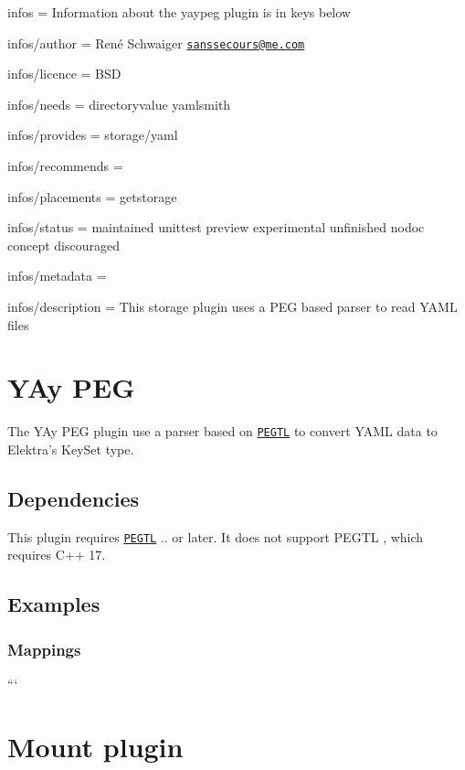 
\begin{DoxyItemize}
\item infos = Information about the yaypeg plugin is in keys below
\item infos/author = René Schwaiger \href{mailto:sanssecours@me.com}{\tt sanssecours@me.\+com}
\item infos/licence = B\+SD
\item infos/needs = directoryvalue yamlsmith
\item infos/provides = storage/yaml
\item infos/recommends =
\item infos/placements = getstorage
\item infos/status = maintained unittest preview experimental unfinished nodoc concept discouraged
\item infos/metadata =
\item infos/description = This storage plugin uses a P\+EG based parser to read Y\+A\+ML files
\end{DoxyItemize}\hypertarget{md_src_plugins_yaypeg_README_src_plugins_yaypeg_README_md}{}\section{Y\+Ay P\+EG}\label{md_src_plugins_yaypeg_README_src_plugins_yaypeg_README_md}
The Y\+Ay P\+EG plugin use a parser based on \href{https://github.com/taocpp/PEGTL}{\tt P\+E\+G\+TL} to convert Y\+A\+ML data to Elektra’s {\ttfamily Key\+Set} type.

\subsection*{Dependencies}

This plugin requires \href{https://repology.org/project/pegtl/versions}{\tt P\+E\+G\+TL} {..} or later. It does not support P\+E\+G\+TL {}, which requires C++ 17.

\subsection*{Examples}

\subsubsection*{Mappings}

``` \section*{Mount plugin}

